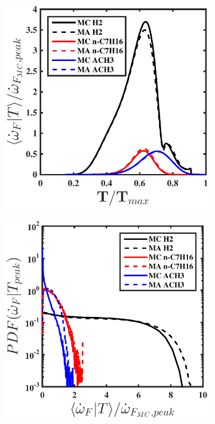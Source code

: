 \documentclass[preprint,review,12pt]{elsarticle}
\begin{document}
\begin{figure}[htb]
\begin{subfigure}{0.33\textwidth}
            \includegraphics[width=\textwidth]{condmean_source.pdf}
        \caption{}\label{A posteriori (b)}
    \end{subfigure}
    \begin{subfigure}{0.33\textwidth}
        \centering
            \includegraphics[width=\textwidth]{condmean_source_PDF.pdf}

\end{subfigure}
\end{figure}
\end{document}
